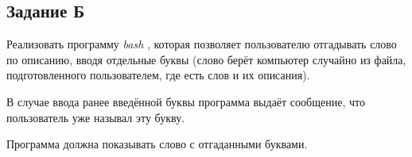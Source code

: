 \documentclass[12pt, a4paper]{report}
\begin{document}
		\lstset{style=mystyle}
		
		
		\subsection*{Задание Б}
		Реализовать программу \textit{bash} , которая позволяет пользователю отгадывать слово по описанию, вводя отдельные буквы (слово берёт компьютер случайно из файла, подготовленного пользователем, где есть слов и их описания). \par
		В случае ввода ранее введённой буквы программа выдаёт сообщение, что пользователь уже называл эту букву. \par
		Программа должна показывать слово с отгаданными буквами.
\end{document}
